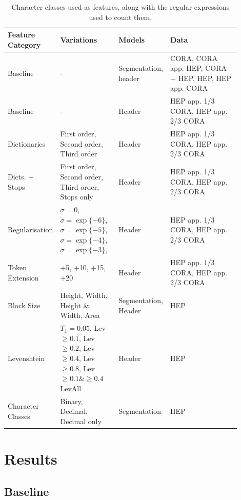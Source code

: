\begin{table}[h]
\begin{center}
\begin{tabular}{ | p{0.2\linewidth} | p{0.25\linewidth} | p{0.15\linewidth} | p{0.3\linewidth} |}
\hline
Feature Category & Variations & Models & Data\\
\hline
Baseline & - & Segmentation, header & CORA, CORA app. HEP, CORA + HEP, HEP, HEP app. CORA \\
\hline
Baseline & - & Header & HEP app. 1/3 CORA, HEP app. 2/3 CORA \\
\hline
Dictionaries & First order, Second order, Third order & Header & HEP app. 1/3 CORA, HEP app. 2/3 CORA \\
\hline
Dicts. + Stops & First order, Second order, Third order, Stops only & Header & HEP app. 1/3 CORA, HEP app. 2/3 CORA \\
\hline
Regularisation & $\sigma=0$, $\sigma=\exp\{-6\}$,$\sigma=\exp\{-5\}$,$\sigma=\exp\{-4\}$,$\sigma=\exp\{-3\}$, & Header & HEP app. 1/3 CORA, HEP app. 2/3 CORA \\
\hline
Token Extension & +5, +10, +15, +20 & Header & HEP app. 1/3 CORA, HEP app. 2/3 CORA \\
\hline
Block Size & Height, Width, Height \& Width, Area & Segmentation, Header & HEP \\
\hline
Levenshtein & $T_1 = 0.05$, Lev$\geq0.1$, Lev$\geq0.2$, Lev$\geq0.4$, Lev$\geq0.8$, Lev$\geq0.1 \& \geq0.4$ LevAll & Header & HEP \\
\hline
Character Classes & Binary, Decimal, Decimal only & Segmentation & HEP \\
\hline
\end{tabular}
\caption[Character classes used as features, along with the regular expressions used to count them.]{Character classes used as features, along with the regular expressions used to count them.}
\label{table:experiments}
\end{center}
\end{table}

\section{Results}

\subsection{Baseline}

